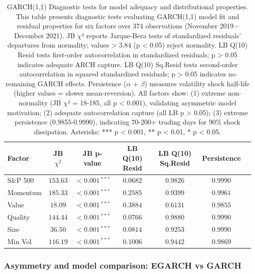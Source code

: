 \documentclass{article}
\begin{document}
\begin{table}[htbp]
\centering
\caption{GARCH(1,1) Diagnostic tests for model adequacy and distributional properties. This table presents diagnostic tests evaluating GARCH(1,1) model fit and residual properties for six factors over 374 observations (November 2019 - December 2021). JB $\chi$² reports Jarque-Bera tests of standardized residuals’ departures from normality; values > 3.84 (p < 0.05) reject normality. LB Q(10) Resid tests first-order autocorrelation in standardized residuals; p > 0.05 indicates adequate ARCH capture. LB Q(10) Sq.Resid tests second-order autocorrelation in squared standardized residuals; p > 0.05 indicates no remaining GARCH effects. Persistence ($\alpha$ + $\beta$) measures volatility shock half-life (higher values = slower mean-reversion). All factors show: (1) extreme non-normality (JB $\chi$² = 18-185, all p < 0.001), validating asymmetric model motivation; (2) adequate autocorrelation capture (all LB p > 0.05); (3) extreme persistence (0.9855-0.9990), indicating 70-200+ trading days for 90\% shock dissipation. Asterisks: *** p < 0.001, ** p < 0.01, * p < 0.05.}
\label{tab:garch_diagnostics}
\begin{tabular}{lcccccc}
\toprule
\textbf{Factor} & \textbf{JB $\chi^2$} & \textbf{JB p-value} & \textbf{LB Q(10) Resid} & \textbf{LB Q(10) Sq.Resid} & \textbf{Persistence} \\
\midrule
S\&P 500   & $153.63$ & $<0.001\,^{***}$ & $0.0682$ & $0.9826$ & $0.9990$ \\
Momentum   & $185.33$ & $<0.001\,^{***}$ & $0.2585$ & $0.9399$ & $0.9961$ \\
Value      & $18.09$  & $<0.001\,^{***}$ & $0.3884$ & $0.6131$ & $0.9855$ \\
Quality    & $144.44$ & $<0.001\,^{***}$ & $0.0766$ & $0.9880$ & $0.9990$ \\
Size       & $36.50$  & $<0.001\,^{***}$ & $0.0814$ & $0.9253$ & $0.9990$ \\
Min Vol    & $116.19$ & $<0.001\,^{***}$ & $0.1006$ & $0.9442$ & $0.9869$ \\
\bottomrule
\end{tabular}
\end{table}


\subsubsection{Asymmetry and model comparison: EGARCH vs GARCH}
\end{document}
